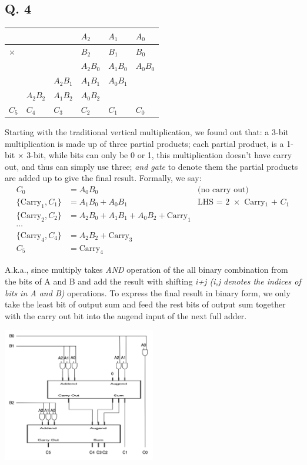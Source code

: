 \subsection*{Q. 4}
\begin{longtable}[c]{llllll}
         &          &          & $A_2$    & $A_1$    & $A_0$    \\
\endfirsthead
%
\endhead
%
$\times$ &          &          & $B_2$    & $B_1$    & $B_0$    \\ \hline
         &          &          & $A_2B_0$ & $A_1B_0$ & $A_0B_0$ \\
         &          & $A_2B_1$ & $A_1B_1$ & $A_0B_1$ &          \\
         & $A_2B_2$ & $A_1B_2$ & $A_0B_2$ &          &          \\ \hline
$C_5$\quad & $C_4$    & $C_3$    & $C_2$    & $C_1$    & $C_0$   
\end{longtable}
\par Starting with the traditional vertical multiplication, we found out that:  a 3-bit multiplication is made up of three partial products;  each partial product, is a 1-bit $\times$ 3-bit, while bits can only be 0 or 1, this multiplication doesn't have carry out, and thus can simply use three; \emph{and gate} to denote them  the partial products are added up to give the final result. Formally, we say:
\begin{align*}
C_0&=A_0B_0&\text{(no carry out)}\\
\{\text{Carry}_1, C_1\}&=A_1B_0+A_0B_1&\text{LHS = 2 $\times$ Carry$_1$ + $C_1$}\\
\{\text{Carry}_2, C_2\}&=A_2B_0+A_1B_1+A_0B_2+\text{Carry}_1\\
\cdots\\
\{\text{Carry}_4, C_4\}&=A_2B_2+\text{Carry}_3\\
C_5&=\text{Carry}_4
\end{align*}
\par A.k.a., since multiply takes \emph{AND} operation of the all binary combination from the bits of A and B and add the result with shifting \emph{i+j (i,j denotes the indices of bits in A and B)} operations. To express the final result in binary form, we only take the least bit of output sum and feed the rest bits of output sum together with the carry out bit into the augend input of the next full adder. \\
\vspace{1em}
\centerline{\includegraphics[width=0.5\textwidth]{fig/q4}}

